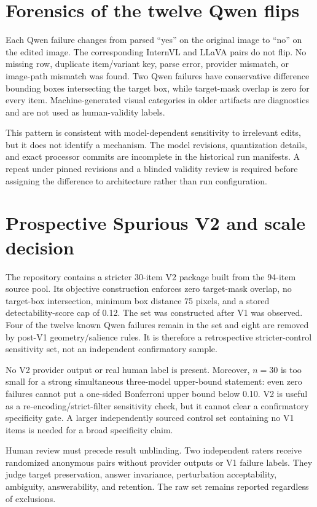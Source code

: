 \documentclass[10pt]{article}
\begin{document}
\section{Forensics of the twelve Qwen flips}

Each Qwen failure changes from parsed ``yes'' on the original image to ``no'' on the
edited image. The corresponding InternVL and LLaVA pairs do not flip. No missing row,
duplicate item/variant key, parse error, provider mismatch, or image-path mismatch was
found. Two Qwen failures have conservative difference bounding boxes intersecting the
target box, while target-mask overlap is zero for every item. Machine-generated visual
categories in older artifacts are diagnostics and are not used as human-validity labels.

This pattern is consistent with model-dependent sensitivity to irrelevant edits, but it
does not identify a mechanism. The model revisions, quantization details, and exact
processor commits are incomplete in the historical run manifests. A repeat under pinned
revisions and a blinded validity review is required before assigning the difference to
architecture rather than run configuration.

\section{Prospective Spurious V2 and scale decision}

The repository contains a stricter 30-item V2 package built from the 94-item source pool.
Its objective construction enforces zero target-mask overlap, no target-box intersection,
minimum box distance 75 pixels, and a stored detectability-score cap of 0.12. The set was
constructed after V1 was observed. Four of the twelve known Qwen failures remain in the
set and eight are removed by post-V1 geometry/salience rules. It is therefore a
retrospective stricter-control sensitivity set, not an independent confirmatory sample.

No V2 provider output or real human label is present. Moreover, $n=30$ is too small for a
strong simultaneous three-model upper-bound statement: even zero failures cannot put a
one-sided Bonferroni upper bound below 0.10. V2 is useful as a re-encoding/strict-filter
sensitivity check, but it cannot clear a confirmatory specificity gate. A larger
independently sourced control set containing no V1 items is needed for a broad
specificity claim.

Human review must precede result unblinding. Two independent raters receive randomized
anonymous pairs without provider outputs or V1 failure labels. They judge target
preservation, answer invariance, perturbation acceptability, ambiguity, answerability,
and retention. The raw set remains reported regardless of exclusions.
\end{document}

